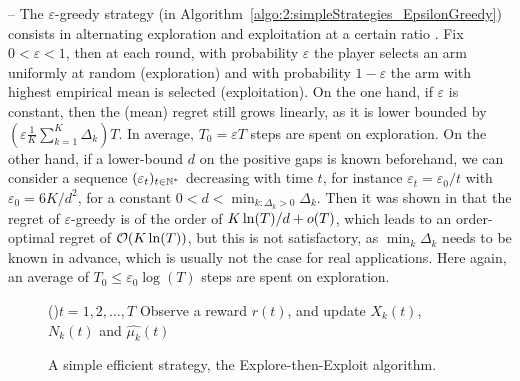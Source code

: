 -- The \textcolor{deeppurple}{$\varepsilon$-greedy strategy} (in Algorithm~\ref{algo:2:simpleStrategies_EpsilonGreedy})
consists in alternating exploration and exploitation at a certain ratio \cite{Auer02}.
Fix $0<\varepsilon<1$, then at each round, with probability $\varepsilon$ the player selects an arm uniformly at random (exploration) and with probability $1-\varepsilon$ the arm with highest empirical mean is selected (exploitation).
On the one hand, if $\varepsilon$ is constant, then the (mean) regret still grows linearly, as it is lower bounded by $(\varepsilon \frac{1}{K} \sum_{k=1}^K \Delta_k) T$.
In average, $T_0 = \varepsilon T$ steps are spent on exploration.
%
On the other hand, if a lower-bound $d$ on the positive gaps is known beforehand,
we can consider a sequence $(\varepsilon_t)_{t\in\mathbb{N}^*}$ decreasing with time $t$, for instance $\varepsilon_t = \varepsilon_0 / t$ with $\varepsilon_0 = 6 K / d^2$, for a constant $0 < d < \min_{k: \Delta_k > 0} \Delta_k$.
Then it was shown in \cite{Auer02} that the regret of $\varepsilon$-greedy is of the order of $K \ln(T) / d + \mathop{}\mathopen{}o\mathopen{}\left(T\right)$, which leads to an order-optimal regret of $\mathop{}\mathopen{}\mathcal{O}\mathopen{}\left(K \ln(T)\right)$,
but this is not satisfactory, as $\min_k \Delta_k$ needs to be known in advance, which is usually not the case for real applications.
Here again, an average of $T_0 \leq \varepsilon_0 \log(T)$ steps are spent on exploration.


\begin{figure}[h!]
	\centering
    \begin{framed}
	\begin{algorithm}[H]
		\For(){$t = 1, 2, \dots, T$}{
            Observe a reward $r(t)$, and update $X_k(t)$, $N_k(t)$ and $\widehat{\mu_k}(t)$
		}
		\caption[A simple efficient strategy, the Explore-then-Exploit algorithm.]{A simple efficient strategy, the \textcolor{deepgold}{Explore-then-Exploit} algorithm.}
		\label{algo:2:simpleStrategies_ExploreThenExploit}
	\end{algorithm}
	\end{framed}
\end{figure}


